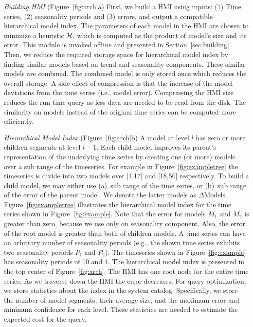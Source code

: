 \documentclass{sigmod}
\newcommand{\LN}{hierarchical model index}
\newcommand{\LNs}{hierarchical model index }
\newcommand{\HMI}{Hierarchical Model Index }
\begin{document}
{\em Building HMI} (Figure~\ref{fig:arch}a) First, we  build a HMI  using inputs: (1) Time series, (2)  seasonality periods and (3) errors, and output a compatible \LN.  
The parameters of each model in the HMI are chosen to minimize a heuristic $\cal H$, which is computed as  the product of model's size and its error. This module is invoked offline and presented in Section~\ref{sec:building}.
Then, we reduce the required storage space for \LNs by finding similar models  based on trend and seasonality components. These similar models are combined. The combined model is only stored once which reduces the overall storage. A side effect of  compression is that the increase of the model deviations from the time series (i.e., model error). Compressing the HMI size reduces the run time query as less data are needed to be read from the disk.
The similarity on models instead of the original time series can be computed more efficiently. 

{\em \HMI} (Figure~\ref{fig:arch}b)
  A model  at level $l$ has zero or more children segments at level $l-1$.  Each child model improves its parent's representation of the underlying time series by creating one (or more)  models over a sub range of the timeseries. For example in Figure~\ref{fig:exampletree} the timeseries is divide into two models over [1,17] and [18,50] respectively. To build a child model, we may either use  (a)~sub range of the time series, or (b)~sub range of the error of the parent model. We denote the latter models as $\Delta$Models. 
Figure~\ref{fig:exampletree} illustrates the hierarchical model index for the time series shown in Figure~\ref{fig:example}. Note that the error for models $M_1$ and $M_2$ is greater than zero, because we use only on seasonality component. Also, the error of the root model is greater than both of children models.
A time series can have an arbitrary number of seasonality periods (e.g., the shown time series exhibits two seasonality periods $P_1$ and $P_2$).  The timeseries shown in Figure~\ref{fig:example} has seasonality periods of 10 and 4. The \LNs is presented in the top center of Figure~\ref{fig:arch}.
The HMI has one root node for the entire time series, As we traverse down the HMI the error decreases. 
 For query optimization, we store statistics about the index in the system catalog. Specifically, we store the number of model segments, their average size, and the maximum error and minimum confidence for each level. These statistics are needed to estimate the expected cost for the query.
\end{document}

